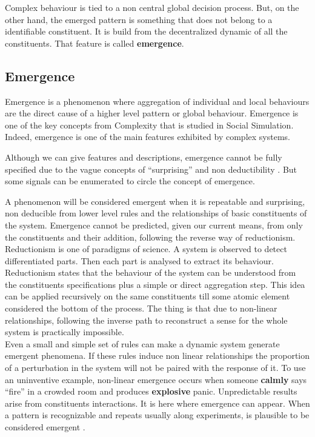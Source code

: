 \documentclass[11pt,oneside,a4paper,openright]{report}
\begin{document}
Complex behaviour is tied to a non central global decision process. But, on the other hand, the emerged pattern is
something that does not belong to a identifiable constituent. It is build from the decentralized dynamic of all 
the constituents. That feature is called \textbf{emergence}.

\subsection{Emergence}



Emergence is a phenomenon where aggregation of individual and local behaviours are the direct cause
of a higher level pattern or global behaviour. Emergence is one of the key concepts from Complexity 
that is studied in Social Simulation. Indeed, emergence is one of the main features exhibited by 
complex systems.\cite{MillerPage2007}

Although we can give features and descriptions, emergence cannot be fully specified due to the vague 
concepts of ``surprising'' and non deductibility \cite{Holland1997} . But some signals can 
be enumerated to circle the concept of emergence. 

A phenomenon will be considered emergent when it is repeatable and surprising, non deducible from lower 
level rules and the relationships of basic constituents of the system.
Emergence cannot be predicted, given our current means, from only the constituents and their addition, 
following the reverse way of reductionism. Reductionism is one of paradigms of science. A system is observed
to detect differentiated parts. Then each part is analysed to extract its behaviour. Reductionism states
that the behaviour of the system can be understood from the constituents specifications plus a simple or 
direct aggregation step. This idea can be applied recursively on the same constituents till some atomic element
considered the bottom of the process. The thing is that due to non-linear relationships, following the inverse
path to reconstruct a sense for the whole system is practically impossible.\\

Even a small and simple set of rules can make a dynamic system generate emergent phenomena. 
If these rules induce non linear relationships the proportion of a perturbation in the system will not 
be paired with the response of it. To use an uninventive example, non-linear emergence occurs when someone 
\textbf{calmly} says “fire” in a crowded room and produces \textbf{explosive} panic. Unpredictable results 
arise from constituents interactions. It is here where emergence can appear. When a pattern is recognizable 
and repeats usually along experiments, is plausible to be considered emergent \cite{Holland1997}.\\  
\end{document}
